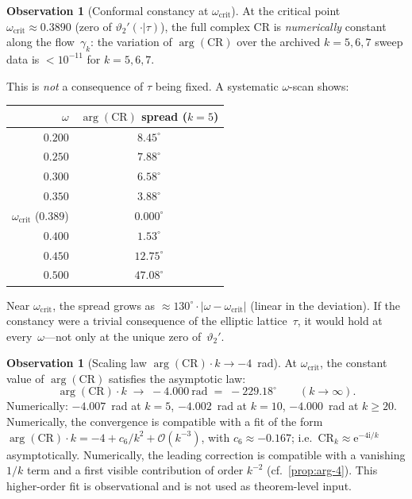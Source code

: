 \documentclass[11pt,a4paper]{article}
\theoremstyle{plain}
\theoremstyle{definition}
\newtheorem{observation}[theorem]{Observation}
\theoremstyle{remark}
\newcommand{\vt}[1]{\vartheta_{#1}}     %
\newcommand{\ee}{\mathrm{e}}
\newcommand{\ii}{\mathrm{i}}
\newcommand{\abs}[1]{\lvert #1 \rvert}
\newcommand{\Oo}{\mathcal{O}}
\begin{document}
\begin{observation}[Conformal constancy at $\omega_{\mathrm{crit}}$]
\label{obs:CR-const}
At the critical point $\omega_{\mathrm{crit}} \approx 0.3890$
(zero of $\vt{2}'(\cdot|\tau)$), the full complex $\mathrm{CR}$
is \emph{numerically} constant along the flow~$\gamma_k$: the
variation of $\arg(\mathrm{CR})$ over the archived $k=5,6,7$ sweep data
is $< 10^{-11}$ for $k = 5, 6, 7$.

This is \emph{not} a consequence of $\tau$ being fixed.
A systematic $\omega$-scan shows:
\begin{center}
\begin{tabular}{@{}rc@{}}
\toprule
$\omega$ & $\arg(\mathrm{CR})$ spread ($k=5$) \\
\midrule
$0.200$ & $8.45^\circ$ \\
$0.250$ & $7.88^\circ$ \\
$0.300$ & $6.58^\circ$ \\
$0.350$ & $3.88^\circ$ \\
$\omega_{\mathrm{crit}}$ ($0.389$) & $\mathbf{0.000}^\circ$ \\
$0.400$ & $1.53^\circ$ \\
$0.450$ & $12.75^\circ$ \\
$0.500$ & $47.08^\circ$ \\
\bottomrule
\end{tabular}
\end{center}
Near $\omega_{\mathrm{crit}}$, the spread grows as
$\approx 130^\circ \cdot \abs{\omega - \omega_{\mathrm{crit}}}$
(linear in the deviation).  If the constancy were a trivial
consequence of the elliptic lattice~$\tau$, it would hold at
every~$\omega$---not only at the unique zero of~$\vt{2}'$.
\end{observation}

\begin{observation}[Scaling law $\arg(\mathrm{CR}) \cdot k \to -4$~rad]
\label{obs:arg-scaling}
At $\omega_{\mathrm{crit}}$, the constant value of
$\arg(\mathrm{CR})$ satisfies the asymptotic law:
\begin{equation}
  \arg(\mathrm{CR}) \cdot k \;\longrightarrow\;
  -4.000~\text{rad} \;=\; -229.18^\circ
  \qquad (k \to \infty).
  \label{eq:arg-4}
\end{equation}
Numerically: $-4.007$~rad at $k=5$, $-4.002$~rad at $k=10$,
$-4.000$~rad at $k \geq 20$.  Numerically, the convergence is
compatible with a fit of the form
$\arg(\mathrm{CR})\cdot k = -4 + c_6/k^2 + \Oo(k^{-3})$,
with $c_6 \approx -0.167$;
i.e.\ $\mathrm{CR}_k \approx \ee^{-4\ii/k}$ asymptotically.
  Numerically, the leading correction is compatible with a vanishing
  $1/k$ term and a first visible contribution of order $k^{-2}$
  (cf.\ \cref{prop:arg-4}).  This higher-order fit is observational and
  is not used as theorem-level input.
\end{observation}
\end{document}
